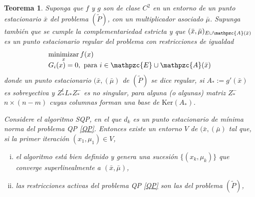 \documentclass[a4paper,10pt]{book}
\newcommand{\bx}{\bar{x}}
\newcommand{\bmu}{\bar{\mu}}
\newcommand{\cE}{\mathpzc{E}}
\newcommand{\cA}{\mathpzc{A}}
\newtheorem{teo}{Teorema}[section]
\begin{document}
\begin{teo}
Suponga que $f$ y $g$ son de clase $C^2$ en un entorno de un punto estacionario $\bx$ del problema $(\tilde{P})$, con un multiplicador asociado $\bmu$. Supunga también que se cumple la complementariedad estricta y que $(\bx,\bmu)_{E\cup \cA(\bx)}$ es un punto estacionario regular del problema con restricciones de igualdad 
\begin{equation}\label{pconver}
    \begin{array}{ll}
    \displaystyle \mathop{\mathrm{minimizar}}_{x} f(x)\\
    G_i(x)=0, \mbox{    para } i\in \cE\cup \cA(\bx)
    \end{array}
\end{equation}
donde un punto estacionario $(\bx,(\bmu)$ de $(\tilde{P})$ se dice regular, si $A_*:=g'(\bx)$ es sobreyectiva y $Z_*^tL_*Z_*^-$ es no singular, para alguna (o algunas) matriz $Z_*^-$ $n\times (n-m)$ cuyas columnas forman una base de $\mathrm{Ker}(A_*)$.

Considere el algoritmo SQP, en el que $d_k$ es un punto estacionario de mínima norma del problema QP \eqref{QP}. Entonces existe un entorno $V$ de $(\bx,(\bmu)$ tal que, si la primer iteración $(x_1,\mu_1)\in V$,
\begin{enumerate}[i)]
\item el algoritmo está bien definido y genera una sucesión $\{(x_k,\mu_k)\}$ que converge superlinealmente a $(\bx,\bmu)$,
\item las restricciones activas del problema QP \eqref{QP} son las del problema $(\tilde{P})$,
\end{enumerate}
\end{teo}
\end{document}
